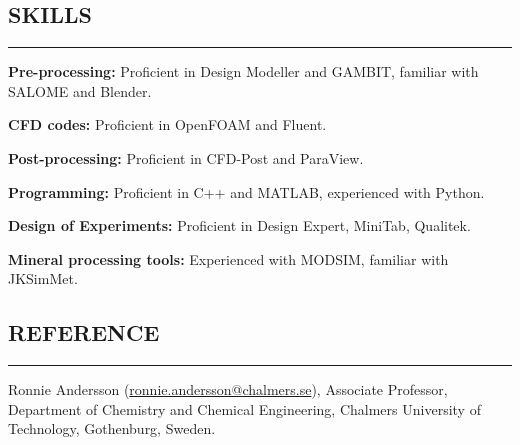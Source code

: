 \documentclass[10pt,a4]{article}
\begin{document}
\subsection*{SKILLS}
\hrule
\vspace{0.2cm}
\begin{list}{}{}
	\item \textbf{Pre-processing:} Proficient in Design Modeller and GAMBIT, familiar with SALOME and Blender.
	\item \textbf{CFD codes:} Proficient in OpenFOAM and Fluent.
	\item \textbf{Post-processing:} Proficient in CFD-Post and ParaView.	
	\item \textbf{Programming:} Proficient in C++ and MATLAB, experienced with Python.
    \item \textbf{Design of Experiments:} Proficient in Design Expert, MiniTab, Qualitek.
    \item \textbf{Mineral processing tools:} Experienced with MODSIM, familiar with JKSimMet.
\end{list}


\subsection*{REFERENCE}
\hrule
\vspace{0.2cm}

\begin{list}{}{}
\item  Ronnie Andersson (\href{mailto:ronnie.andersson@chalmers.se}{ronnie.andersson@chalmers.se}), Associate Professor, Department of Chemistry and Chemical Engineering, Chalmers University of Technology, Gothenburg, Sweden.

\end{list}

\thispagestyle{fancy}
\rfoot{\textcolor{gray}{Page \thepage}}
\fancyfoot[C]{}
\end{document}
